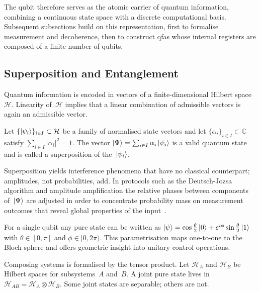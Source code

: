  The qubit therefore serves as the atomic carrier of quantum information,
 combining a continuous state space with a discrete computational basis.
 Subsequent subsections build on this representation, first to formalise
 measurement and decoherence, then to construct \glspl{qfa}
 whose internal registers are composed of a finite number of qubits.

 \subsection{Superposition and Entanglement}\label{subsec:superposition_entanglement}

 Quantum information is encoded in vectors of a finite-dimensional Hilbert space~$\mathcal H$.  
 Linearity of~$\mathcal H$ implies that a linear combination of admissible vectors is again an admissible vector.  
 
 \begin{definition}
   Let $\{\ket{\psi_i}\}_{i\in I}\subset\mathcal H$ be a family of normalised state vectors and let $\{\alpha_i\}_{i\in I}\subset\mathbb C$ satisfy $\sum_{i\in I}\lvert\alpha_i\rvert^2=1$.  
   The vector $\ket{\Psi}=\sum_{i\in I}\alpha_i\ket{\psi_i}$ is a valid quantum state and is called a superposition of the~$\ket{\psi_i}$.
 \end{definition}
 
 Superposition yields interference phenomena that have no classical counterpart; amplitudes, not probabilities, add.  
 In protocols such as the Deutsch-Jozsa algorithm and amplitude amplification the relative phases between components of~$\ket{\Psi}$ are adjusted in order to concentrate probability mass on measurement outcomes that reveal global properties of the input~\cite{NielsenChuang2010}.  
 
 \begin{remark}
   For a single qubit any pure state can be written as $\ket{\psi}=\cos\frac\theta2\ket{0}+e^{i\phi}\sin\frac\theta2\ket{1}$ with $\theta\in[0,\pi]$ and $\phi\in[0,2\pi)$.  
   This parametrisation maps one-to-one to the Bloch sphere and offers geometric insight into unitary control operations.
 \end{remark}
 
 
 Composing systems is formalised by the tensor product.  
 Let $\mathcal H_A$ and $\mathcal H_B$ be Hilbert spaces for subsystems~$A$ and~$B$.  
 A joint pure state lives in $\mathcal H_{AB}=\mathcal H_A\otimes\mathcal H_B$.  
 Some joint states are separable; others are not.
 
